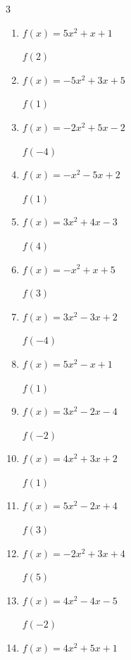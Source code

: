 \begin{multicols}{3}
\begin{enumerate}
$f(-4)$
        \phantom{$= 105$}

  \item $f(x)=5x^{2}+x+1$

$f(2)$
        \phantom{$= 23$}

  \item $f(x)=-5x^{2}+3x+5$

$f(1)$
        \phantom{$= 3$}

  \item $f(x)=-2x^{2}+5x-2$

$f(-4)$
        \phantom{$= -54$}

  \item $f(x)=-x^{2}-5x+2$

$f(1)$
        \phantom{$= -4$}

  \item $f(x)=3x^{2}+4x-3$

$f(4)$
        \phantom{$= 61$}

  \item $f(x)=-x^{2}+x+5$

$f(3)$
        \phantom{$= -1$}

  \item $f(x)=3x^{2}-3x+2$

$f(-4)$
        \phantom{$= 62$}

  \item $f(x)=5x^{2}-x+1$

$f(1)$
        \phantom{$= 5$}

  \item $f(x)=3x^{2}-2x-4$

$f(-2)$
        \phantom{$= 12$}

  \item $f(x)=4x^{2}+3x+2$

$f(1)$
        \phantom{$= 9$}

\columnbreak %

\resetques

  \item $f(x)=5x^{2}-2x+4$

$f(3)$
        \phantom{$= 43$}

  \item $f(x)=-2x^{2}+3x+4$

$f(5)$
        \phantom{$= -31$}

  \item $f(x)=4x^{2}-4x-5$

$f(-2)$
        \phantom{$= 19$}

  \item $f(x)=4x^{2}+5x+1$


\end{enumerate}
\end{multicols}
